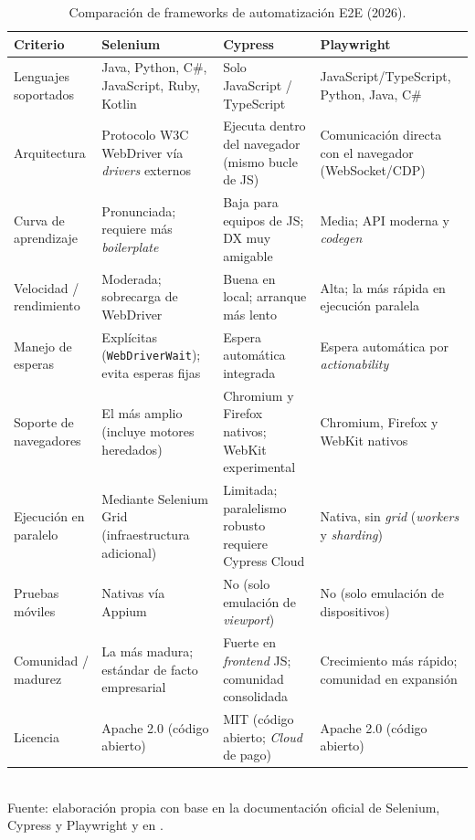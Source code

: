 \documentclass[12pt]{article}
\begin{document}
\begin{table}[htbp]
\centering
\footnotesize
\caption{Comparación de frameworks de automatización E2E (2026).}
\label{tab:e2e}
\renewcommand{\arraystretch}{1.25}
\begin{tabularx}{\textwidth}{>{\RaggedRight\arraybackslash}p{}
                             >{\RaggedRight\arraybackslash}X
                             >{\RaggedRight\arraybackslash}X
                             >{\RaggedRight\arraybackslash}X}
\toprule
\textbf{Criterio} & \textbf{Selenium} & \textbf{Cypress} & \textbf{Playwright} \\
\midrule
Lenguajes soportados &
Java, Python, C\#, JavaScript, Ruby, Kotlin &
Solo JavaScript / TypeScript &
JavaScript/TypeScript, Python, Java, C\# \\

Arquitectura &
Protocolo W3C WebDriver vía \textit{drivers} externos &
Ejecuta dentro del navegador (mismo bucle de JS) &
Comunicación directa con el navegador (WebSocket/CDP) \\

Curva de aprendizaje &
Pronunciada; requiere más \textit{boilerplate} &
Baja para equipos de JS; DX muy amigable &
Media; API moderna y \textit{codegen} \\

Velocidad / rendimiento &
Moderada; sobrecarga de WebDriver &
Buena en local; arranque más lento &
Alta; la más rápida en ejecución paralela \\

Manejo de esperas &
Explícitas (\texttt{WebDriverWait}); evita esperas fijas &
Espera automática integrada &
Espera automática por \textit{actionability} \\

Soporte de navegadores &
El más amplio (incluye motores heredados) &
Chromium y Firefox nativos; WebKit experimental &
Chromium, Firefox y WebKit nativos \\

Ejecución en paralelo &
Mediante Selenium Grid (infraestructura adicional) &
Limitada; paralelismo robusto requiere Cypress Cloud &
Nativa, sin \textit{grid} (\textit{workers} y \textit{sharding}) \\

Pruebas móviles &
Nativas vía Appium &
No (solo emulación de \textit{viewport}) &
No (solo emulación de dispositivos) \\

Comunidad / madurez &
La más madura; estándar de facto empresarial &
Fuerte en \textit{frontend} JS; comunidad consolidada &
Crecimiento más rápido; comunidad en expansión \\

Licencia &
Apache 2.0 (código abierto) &
MIT (código abierto; \textit{Cloud} de pago) &
Apache 2.0 (código abierto) \\
\bottomrule
\end{tabularx}
\\[2pt]
{\footnotesize Fuente: elaboración propia con base en la documentación oficial de
Selenium, Cypress y Playwright \citep{seleniumdocs, cypressdocs, playwrightdocs} y
en \citet{garcia2022}.}
\end{table}
\end{document}
